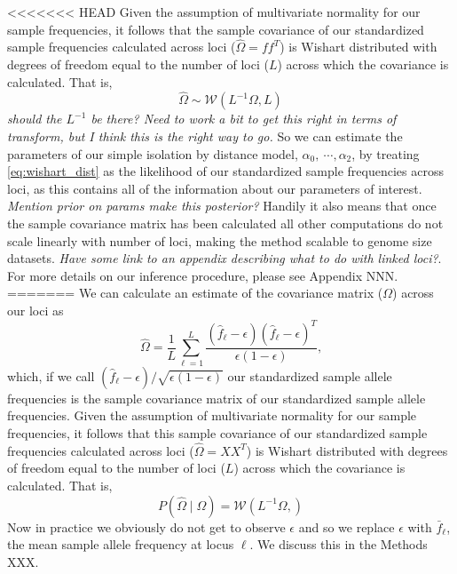 \documentclass[12pt]{article}
\newcommand{\gc}[1]{{\em \color{blue} #1}}
\begin{document}
<<<<<<< HEAD
Given the assumption of multivariate normality for our sample frequencies, it follows that the sample covariance of our standardized sample frequencies calculated across loci ($\widehat{\Omega} = f f^T$)  is Wishart distributed with degrees of freedom equal to the number of loci ($L$) across which the covariance is calculated.
That is, 
\begin{equation}
\label{eq:wishart_dist}
\widehat{\Omega} \sim \mathcal{W}\left( L^{-1} \Omega, L	\right)
\end{equation}
\gc{should the $L^{-1}$ be there? Need to work a bit to get this right in terms of transform, but I think this is the right way to go.} So we can estimate the parameters of our simple isolation by distance model, $\alpha_0,~\cdots, \alpha_2$, by treating \ref{eq:wishart_dist} as the likelihood of our standardized sample frequencies across loci, as this contains all of the information about our parameters of interest. \gc{Mention prior on params make this posterior?} Handily it also means that once the sample covariance matrix has been calculated all other computations do not scale linearly with number of loci, making the method scalable to genome size datasets. \gc{Have some link to an appendix describing what to do with linked loci?}.  For more details on our inference procedure, please see Appendix NNN.
=======
We can calculate an estimate of the covariance matrix ($\Omega$) across our loci as 
\begin{equation}
\widehat{\Omega} = \frac{1}{L} \sum_{\ell=1}^{L} \frac{(\hat{f}_{\ell}  - \epsilon) (\hat{f}_{\ell}  - \epsilon)^T}{\epsilon(1-\epsilon)} \text{,}
\end{equation}
which, if we call $(\hat{f}_{\ell}  - \epsilon)/\sqrt{\epsilon(1-\epsilon)}$ our standardized sample allele frequencies is the sample covariance matrix of our  standardized sample allele frequencies.
Given the assumption of multivariate normality for our sample frequencies, it follows that this sample covariance of our standardized sample frequencies calculated across loci ($\widehat{\Omega} = X X^T$)  is Wishart distributed with degrees of freedom equal to the number of loci ($L$) across which the covariance is calculated.
That is, 
\begin{equation}
\label{eq:wishart_dist}
P(\widehat{\Omega} \mid \Omega) = \mathcal{W}\left( L^{-1} \Omega, \right)
\end{equation}
Now in practice we obviously do not get to observe $\epsilon$ and so we replace $\epsilon$ with $\bar{f}_{\ell}$, the mean sample allele frequency at locus  $\ell$. We discuss this in the Methods XXX.
\end{document}
